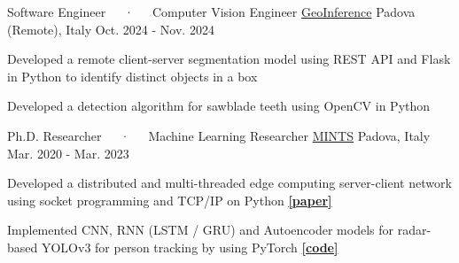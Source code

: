 


\begin{cventries}
  \cventry
    {Software Engineer~~~·~~~Computer Vision Engineer} %
    {\href{https://www.geoinference.com/en/homeeng/}{GeoInference}} %
    {Padova (Remote), Italy} %
    {Oct. 2024 - Nov. 2024} %
    {
      \begin{cvitems} %
        \item {Developed a remote client-server segmentation model using REST API and Flask in Python to identify distinct objects in a box} 
        \item {Developed a detection algorithm for sawblade teeth using OpenCV in Python}
      \end{cvitems}
    }
    
  \cventry
    {Ph.D. Researcher~~~·~~~Machine Learning Researcher} %
    {\href{https://b5g-mints.eu/}
    {MINTS}} %
    {Padova, Italy} %
    {Mar. 2020 - Mar. 2023} %
    {
      \begin{cvitems} %
        \item {Developed a distributed and multi-threaded edge computing server-client network using socket programming and TCP/IP on Python \href{https://dl.acm.org/doi/abs/10.1145/3565474.3569068}{\textbf{[paper]}}}
        \item {Implemented CNN, RNN (LSTM / GRU) and Autoencoder models for radar-based YOLOv3 for person tracking by using PyTorch \href{https://github.com/enverbashirov/YOLOv3-mMwave-Radar}{\textbf{[code]}}}
      \end{cvitems}
    }


\end{cventries}
